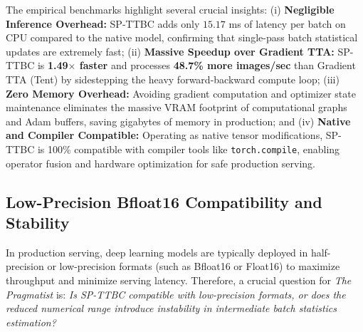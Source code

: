 \documentclass{article}
\theoremstyle{plain}
\theoremstyle{definition}
\theoremstyle{remark}
\begin{document}
\begin{table}[h]
  \caption{Latency and throughput comparison for Native, SP-TTBC, and Gradient TTA (ResNet-18, batch size $64$).}
  \vspace{-5pt}
  \label{tab:latency}
  \centering
  \vspace{-5pt}
\end{table}

The empirical benchmarks highlight several crucial insights: (i) \textbf{Negligible Inference Overhead:} SP-TTBC adds only $15.17$ ms of latency per batch on CPU compared to the native model, confirming that single-pass batch statistical updates are extremely fast; (ii) \textbf{Massive Speedup over Gradient TTA:} SP-TTBC is \textbf{1.49$\times$ faster} and processes \textbf{48.7\% more images/sec} than Gradient TTA (Tent) by sidestepping the heavy forward-backward compute loop; (iii) \textbf{Zero Memory Overhead:} Avoiding gradient computation and optimizer state maintenance eliminates the massive VRAM footprint of computational graphs and Adam buffers, saving gigabytes of memory in production; and (iv) \textbf{Native and Compiler Compatible:} Operating as native tensor modifications, SP-TTBC is 100\% compatible with compiler tools like \texttt{torch.compile}, enabling operator fusion and hardware optimization for safe production serving.

\subsection{Low-Precision Bfloat16 Compatibility and Stability}
\label{bf16_compatibility}
In production serving, deep learning models are typically deployed in half-precision or low-precision formats (such as Bfloat16 or Float16) to maximize throughput and minimize serving latency. Therefore, a crucial question for \textit{The Pragmatist} is: \textit{Is SP-TTBC compatible with low-precision formats, or does the reduced numerical range introduce instability in intermediate batch statistics estimation?}
\end{document}
